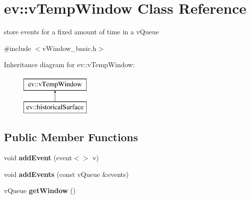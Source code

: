 \hypertarget{classev_1_1vTempWindow}{}\section{ev\+:\+:v\+Temp\+Window Class Reference}
\label{classev_1_1vTempWindow}


store events for a fixed amount of time in a v\+Queue  




{\ttfamily \#include $<$v\+Window\+\_\+basic.\+h$>$}

Inheritance diagram for ev\+:\+:v\+Temp\+Window\+:\begin{figure}[H]
\begin{center}
\leavevmode
\includegraphics[height=2.000000cm]{classev_1_1vTempWindow}
\end{center}
\end{figure}
\subsection*{Public Member Functions}
\begin{DoxyCompactItemize}
\item 
void {\bfseries add\+Event} (event$<$$>$ v)\hypertarget{classev_1_1vTempWindow_a9499371e18cc811e2cd3e47e8e96f8ca}{}\label{classev_1_1vTempWindow_a9499371e18cc811e2cd3e47e8e96f8ca}

\item 
void {\bfseries add\+Events} (const v\+Queue \&events)\hypertarget{classev_1_1vTempWindow_a925ee62f3dff9517654fd6a9a402616b}{}\label{classev_1_1vTempWindow_a925ee62f3dff9517654fd6a9a402616b}

\item 
v\+Queue {\bfseries get\+Window} ()\hypertarget{classev_1_1vTempWindow_a40ddfc12e259c028a57d5dd188b3e2e9}{}\label{classev_1_1vTempWindow_a40ddfc12e259c028a57d5dd188b3e2e9}

\end{DoxyCompactItemize}
